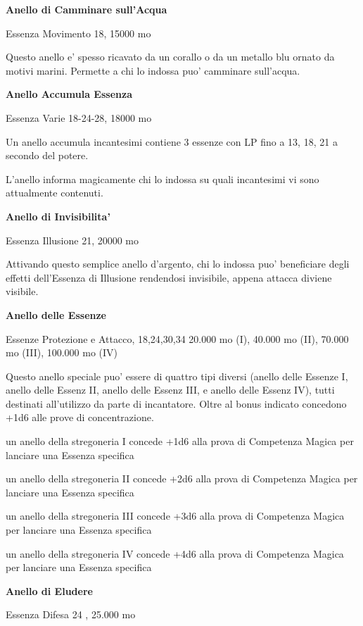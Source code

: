 \documentclass[a4paper,11pt,twoside,openany]{book}
\begin{document}
{		\textbf{Anello di Camminare sull'Acqua}
		
		Essenza Movimento 18, 15000 mo
		
		Questo anello e' spesso ricavato da un corallo o da un metallo blu ornato da motivi marini. Permette a chi lo indossa puo' camminare sull'acqua.
		
		\textbf{Anello Accumula Essenza}
		
		Essenza Varie 18-24-28, 18000 mo
		
		Un anello accumula incantesimi contiene 3 essenze con LP fino a 13, 18, 21 a secondo del potere.
		
		L'anello informa magicamente chi lo indossa su quali incantesimi vi sono attualmente contenuti.
		
		\textbf{Anello di Invisibilita'}
		
		Essenza Illusione 21, 20000 mo
		
		Attivando questo semplice anello d'argento, chi lo indossa puo' beneficiare degli effetti dell'Essenza di Illusione rendendosi invisibile, appena attacca diviene visibile.
		
		\textbf{Anello delle Essenze}
		
		Essenze Protezione e Attacco, 18,24,30,34 20.000 mo (I), 40.000 mo
		(II), 70.000 mo (III), 100.000 mo (IV)
		
		Questo anello speciale puo' essere di quattro tipi diversi (anello delle Essenze I, anello delle Essenz II, anello delle Essenz III, e anello delle Essenz IV), tutti destinati all'utilizzo da parte di incantatore. Oltre al bonus indicato concedono +1d6 alle prove di concentrazione.
		
		un anello della stregoneria I concede +1d6 alla prova di Competenza Magica per lanciare una Essenza specifica
		
		un anello della stregoneria II concede +2d6 alla prova di Competenza Magica per lanciare una Essenza specifica
		
		un anello della stregoneria III concede +3d6 alla prova di Competenza Magica per lanciare una Essenza specifica
		
		un anello della stregoneria IV concede +4d6 alla prova di Competenza Magica per lanciare una Essenza specifica
		
		\textbf{Anello di Eludere}
		
		Essenza Difesa 24 , 25.000 mo
		
}
\end{document}
